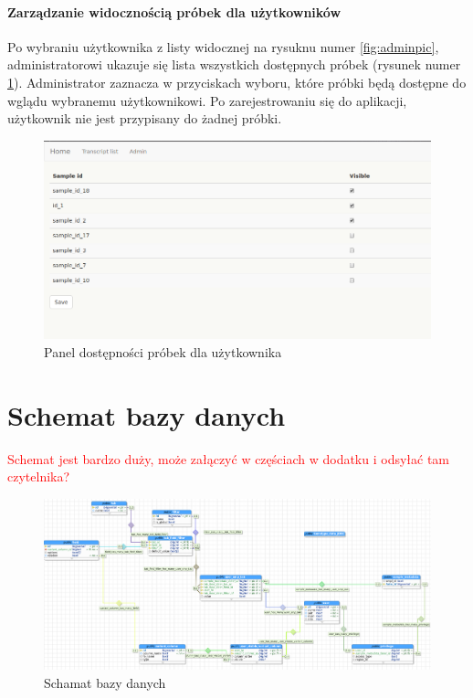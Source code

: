 \documentclass[a4paper,12pt,twoside]{article}
\begin{document}
\newpage
\paragraph{Zarządzanie widocznością próbek dla użytkowników}
Po wybraniu użytkownika z listy widocznej na rysuknu numer \ref{fig:adminpic}, 
administratorowi ukazuje się lista wszystkich dostępnych próbek (rysunek numer \ref{fig:user_priviligespic}). Administrator zaznacza w przyciskach wyboru, które próbki będą dostępne 
do wglądu wybranemu użytkownikowi. Po zarejestrowaniu się do aplikacji, użytkownik nie jest przypisany do żadnej próbki. 
 
\begin{figure}[h]
  \centering
  \includegraphics[width=\textwidth]{obrazy/aplikacja/user_priviliges.png}
  \caption{Panel dostępności próbek dla użytkownika}
  \label{fig:user_priviligespic}
\end{figure}

\newpage
\section{Schemat bazy danych}
\textcolor{red}{
Schemat jest bardzo duży, może załączyć w częściach w dodatku i odsyłać tam czytelnika?
}
\begin{figure}
  \includegraphics[width=\linewidth]{obrazy/aplikacja/database.png}
  \caption{Schamat bazy danych}
  \label{fig:bazadanych}
\end{figure}
\end{document}
